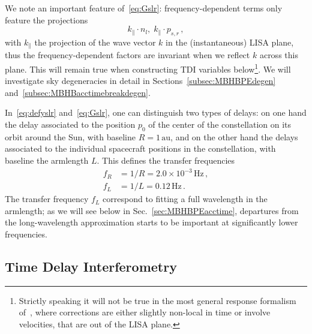 \documentclass[aps,showpacs,twocolumn,prd,superscriptaddress,nofootinbib]{revtex4-1}
\newcommand{\be}{\begin{equation}}
\newcommand{\ee}{\end{equation}}
\newcommand{\bsub}{\begin{subequations}}
\newcommand{\esub}{\end{subequations}}
\newcommand{\Hz}{\,\mathrm{Hz}}
\newcommand{\au}{\,\mathrm{au}}
\begin{document}
We note an important feature of~\eqref{eq:Gslr}: frequency-dependent terms only feature the projections
\be
	k_{\parallel} \cdot n_{l}, \; k_{\parallel} \cdot p_{s,r} \,, 
\ee
with $k_{\parallel}$ the projection of the wave vector $k$ in the (instantaneous) LISA plane, thus the frequency-dependent factors are invariant when we reflect $k$ across this plane. This will remain true when constructing TDI variables below\footnote{Strictly speaking it will not be true in the most general response formalism of~\cite{MB18}, where corrections are either slightly non-local in time or involve velocities, that are out of the LISA plane.}. We will investigate sky degeneracies in detail in Sections~\ref{subsec:MBHBPEdegen} and~\ref{subsec:MBHBacctimebreakdegen}.

In~\eqref{eq:defyslr} and~\eqref{eq:Gslr}, one can distinguish two types of delays: on one hand the delay associated to the position $p_{0}$ of the center of the constellation on its orbit around the Sun, with baseline $R=1 \au$, and on the other hand the delays associated to the individual spacecraft positions in the constellation, with baseline the armlength $L$. This defines the transfer frequencies
\bsub\label{eq:transferfrequencies}
\begin{align}
	f_{R} &= 1/R = 2.0\times10^{-3}\Hz \,,\\
	f_{L} &= 1/L = 0.12\Hz \,.
\end{align}
\esub
The transfer frequency $f_{L}$ correspond to fitting a full wavelength in the armlength; as we will see below in Sec.~\ref{sec:MBHBPEacctime}, departures from the long-wavelength approximation starts to be important at significantly lower frequencies.


\subsection{Time Delay Interferometry}
\label{subsec:TDIresponse}
\end{document}

